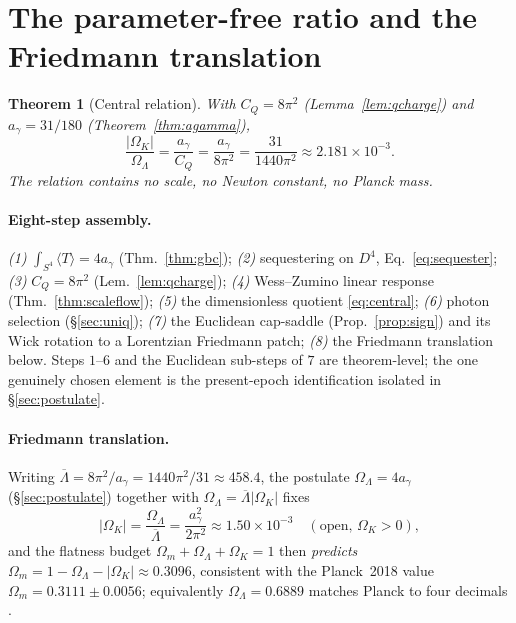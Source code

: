 \documentclass[11pt,a4paper]{article}
\newtheorem{theorem}{Theorem}
\theoremstyle{definition}
\theoremstyle{remark}
\newcommand{\ag}{a_\gamma}
\newcommand{\CQ}{C_Q}
\newcommand{\Ok}{\Omega_K}
\newcommand{\OL}{\Omega_\Lambda}
\newcommand{\Om}{\Omega_m}
\newcommand{\avg}[1]{\langle #1\rangle}
\begin{document}
\section{The parameter-free ratio and the Friedmann translation}\label{sec:friedmann}
\begin{theorem}[Central relation]\label{thm:central}
With $\CQ=8\pi^2$ (Lemma~\ref{lem:qcharge}) and $\ag=31/180$ (Theorem~\ref{thm:agamma}),
\begin{equation}\label{eq:central}
\frac{\lvert\Ok\rvert}{\OL}=\frac{\ag}{\CQ}=\frac{\ag}{8\pi^2}=\frac{31}{1440\pi^2}\approx2.181\times10^{-3}.
\end{equation}
The relation contains no scale, no Newton constant, no Planck mass.
\end{theorem}

\paragraph{Eight-step assembly.}
\emph{(1)} $\int_{S^4}\avg{T}=4\ag$ (Thm.~\ref{thm:gbc}); \emph{(2)} sequestering on $D^4$,
Eq.~\eqref{eq:sequester}; \emph{(3)} $\CQ=8\pi^2$ (Lem.~\ref{lem:qcharge}); \emph{(4)} Wess--Zumino
linear response (Thm.~\ref{thm:scaleflow}); \emph{(5)} the dimensionless quotient
\eqref{eq:central}; \emph{(6)} photon selection (\S\ref{sec:uniq}); \emph{(7)} the Euclidean
cap-saddle (Prop.~\ref{prop:sign}) and its Wick rotation to a Lorentzian Friedmann patch;
\emph{(8)} the Friedmann translation below. Steps $1$--$6$ and the Euclidean sub-steps of $7$ are
theorem-level; the one genuinely chosen element is the present-epoch identification isolated in
\S\ref{sec:postulate}.

\paragraph{Friedmann translation.} Writing $\overline\Lambda=8\pi^2/\ag=1440\pi^2/31\approx458.4$,
the postulate $\OL=4\ag$ (\S\ref{sec:postulate}) together with $\OL=\overline\Lambda\lvert\Ok\rvert$
fixes
\begin{equation}\label{eq:OK}
\lvert\Ok\rvert=\frac{\OL}{\overline\Lambda}=\frac{\ag^2}{2\pi^2}\approx1.50\times10^{-3}
\quad(\text{open, }\Ok>0),
\end{equation}
and the flatness budget $\Om+\OL+\Ok=1$ then \emph{predicts}
$\Om=1-\OL-\lvert\Ok\rvert\approx0.3096$, consistent with the Planck~2018 value
$\Om=0.3111\pm0.0056$; equivalently $\OL=0.6889$ matches Planck to four decimals
\cite{Planck2018}.
\end{document}
